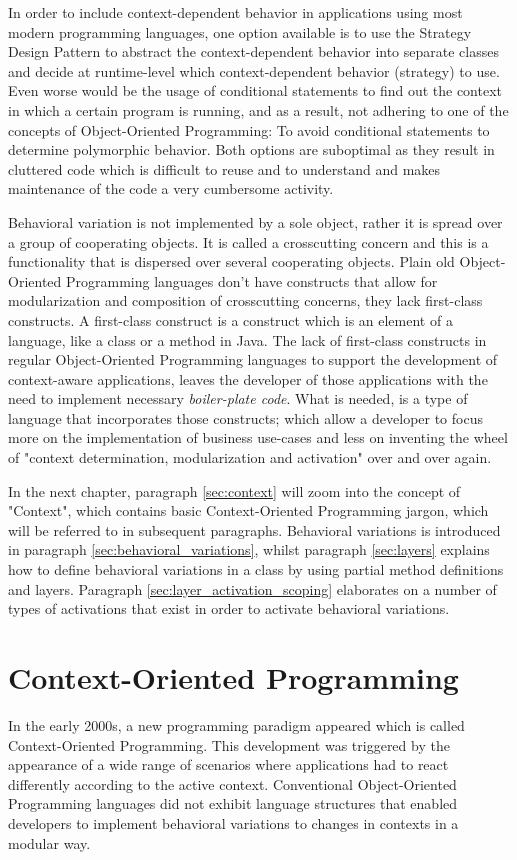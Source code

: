 \documentclass{acm_proc_article-sp}
\begin{document}
In order to include context-dependent behavior in applications using most modern programming languages, one option available is to use the Strategy Design Pattern \cite{Costanza:2005:LCC:1146841.1146842,strategypattern} to abstract the context-dependent behavior into separate classes and decide at runtime-level which context-dependent behavior (strategy) to use. Even worse would be the usage of conditional statements to find out the context in which a certain program is running, and as a result, not adhering to one of the concepts of Object-Oriented Programming: To avoid conditional statements to determine polymorphic behavior. Both options are suboptimal as they result in cluttered code which is difficult to reuse and to understand and makes maintenance of the code a very cumbersome activity.

Behavioral variation is not implemented by a sole object, rather it is spread over a group of cooperating objects. It is called a crosscutting concern \cite{kiczalesetallaop} and this is a functionality that is dispersed over several cooperating objects. Plain old Object-Oriented Programming languages don't have constructs that allow for modularization and composition of crosscutting concerns, they lack first-class constructs. A first-class construct \cite{Keays:2003:CP:940923.940926} is a construct which is an element of a language, like a class or a method in Java. The lack of first-class constructs in regular Object-Oriented Programming languages to support the development of context-aware applications, leaves the developer of those applications with the need to implement necessary \textit{boiler-plate code}. What is needed, is a type of language that incorporates those constructs; which allow a developer to focus more on the implementation of business use-cases and less on inventing the wheel of "context determination, modularization and activation" over and over again. 

In the next chapter, paragraph \ref{sec:context} will zoom into the concept of "Context", which contains basic Context-Oriented Programming jargon, which will be referred to in subsequent paragraphs. Behavioral variations is introduced in paragraph \ref{sec:behavioral_variations}, whilst paragraph \ref{sec:layers} explains how to define behavioral variations in a class by using partial method definitions and layers. Paragraph \ref{sec:layer_activation_scoping} elaborates on a number of types of activations that exist in order to activate behavioral variations. 

\section{Context-Oriented Programming}
\label{cop}
In the early 2000s, a new programming paradigm appeared which is called Context-Oriented Programming. This development was triggered by the appearance of a wide range of scenarios where applications had to react differently according to the active context. Conventional Object-Oriented Programming languages did not exhibit language structures that enabled developers to implement behavioral variations to changes in contexts in a modular way. 
\end{document}
